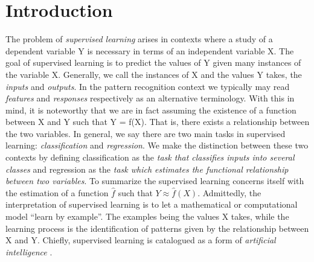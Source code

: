 \documentclass{INGUADY}
\begin{document}
\begin{frontmatter}
\begin{abstract}[Abstract]
\end{abstract}

\begin{bottompar}



\end{bottompar}
\end{frontmatter}


\section{Introduction}
The problem of \textit{supervised learning} arises in contexts where a study of a dependent variable Y is necessary in terms of an independent variable X. The goal of supervised learning is to predict the values of Y given many instances of the variable X. Generally, we call the instances of X and the values Y takes, the \textit{inputs} and \textit{outputs}. In the pattern recognition context we typically may read \textit{features} and \textit{responses} respectively as an alternative terminology. With this in mind, it is noteworthy that we are in fact assuming the existence of a  function between X and Y such that Y = f(X). That is, there exists a relationship between the two variables. In general, we say there are two main tasks in supervised learning: \textit{classification} and \textit{regression}. We make the distinction between these two contexts by defining classification as the \textit{task that classifies inputs into several classes} and regression as the \textit{task which estimates the functional relationship between two variables}. To summarize the supervised learning concerns itself with the estimation of a function $\hat{f}$ such that $Y \approx \hat{f}(X)$. Admittedly, the interpretation of supervised learning is to let a mathematical or computational model ``learn by example''.  The examples being the values X takes, while the learning process is the identification of patterns given by the relationship between X and Y. Chiefly,  supervised learning is catalogued as a form of \textit{artificial intelligence} \cite{goodfellow2016deep}.
\end{document}
